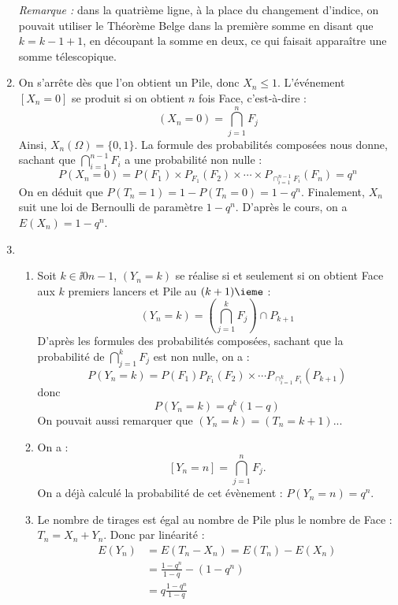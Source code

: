 \documentclass[a4paper,twoside,french,11pt]{VcCours}
\begin{document}
\begin{enumerate}
\textit{Remarque :} dans la quatrième ligne, à la place du changement d'indice, on pouvait utiliser le Théorème Belge dans la première somme en disant que $k=k-1+1$, en découpant la somme en deux, ce qui faisait apparaître une somme télescopique.
\item On s'arrête dès que l'on obtient un Pile, donc $X_n \leq 1$. L'événement $[X_n = 0]$ se produit si on obtient $n$ fois Face, c'est-à-dire :
$$(X_n=0) = \bigcap_{j=1}^n F_j$$
Ainsi, $X_n(\Omega) = \{0,1\}$. La formule des probabilités composées nous donne, sachant que $\bigcap_{i=1}^{n-1} F_i$ a une probabilité non nulle :
$$ P(X_n=0) = P(F_1) \times P_{F_1}(F_2) \times \cdots \times P_{\cap_{i=1}^{n-1} F_i}(F_n) = q^n$$
On en déduit que $P(T_n=1) = 1-P(T_n=0) = 1-q^n$. Finalement, $X_n$ suit une loi de Bernoulli de paramètre $1-q^n$. D'après le cours, on a $E(X_n) = 1-q^n$.
\item 
\begin{enumerate}
\item Soit $k \in \ii 0{n-1}$, $(Y_n=k)$ se réalise si et seulement si on obtient Face aux $k$ premiers lancers et Pile au $(k+1)\ieme$ :
$$(Y_n=k) = \left( \bigcap_{j=1}^k F_j \right) \cap P_{k+1}$$
D'après les formules des probabilités composées, sachant que la probabilité de $\bigcap_{j=1}^k F_j$ est non nulle, on a :
\[ P(Y_n=k) = P(F_1) P_{F_1}(F_2) \times \cdots P_{\cap_{i=1}^k F_i}(P_{k+1}) \]
donc 
$$ P(Y_n = k) = q^k (1-q)$$
On pouvait aussi remarquer que $(Y_n=k)=(T_{n}=k+1)$...
\item On a : $$[Y_n=n]= \bigcap_{j=1}^n F_j.$$ On a déjà calculé la probabilité de cet évènement : $P(Y_n = n) = q^n$.
\item  Le nombre de tirages est égal au nombre de Pile plus le nombre de Face : $T_n=X_n+Y_n$. Donc par linéarité :
\begin{align*}
        E(Y_n) & = E(T_n - X_n) = E(T_n) - E(X_n) \\
         & = \frac{1-q^n}{1-q} - (1-q^n)\\
         &= q \frac{1-q^n}{1-q}
       \end{align*}
\end{enumerate}
\end{enumerate}
\end{document}

